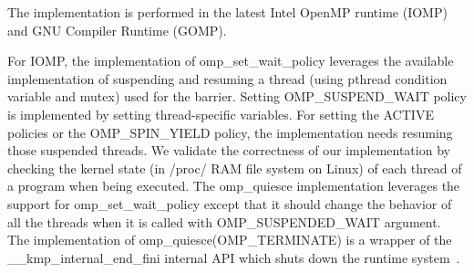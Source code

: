 The implementation is performed in the latest Intel OpenMP runtime (IOMP) and GNU Compiler Runtime (GOMP). %

For IOMP, the implementation of {\sf omp\_set\_wait\_policy} leverages the available 
implementation of suspending and resuming a thread (using pthread condition variable and mutex) 
used for the barrier. Setting  
{\sf OMP\_SUSPEND\_WAIT} policy is implemented by setting thread-specific variables. For
setting the {\sf ACTIVE} policies or the {\sf OMP\_SPIN\_YIELD} policy, 
the implementation needs resuming those suspended threads. %
We validate the correctness of our implementation by checking the kernel state (in /proc/ RAM file system on Linux) 
of each thread of a program when being executed. 
The {\sf omp\_quiesce} implementation leverages the support for {\sf omp\_set\_wait\_policy} except that it 
should change the behavior of all the threads when it is called with {\sf OMP\_SUSPENDED\_WAIT} argument. 
The implementation of {\sf omp\_quiesce(OMP\_TERMINATE)} is a wrapper of 
the {\sf \_\_kmp\_internal\_end\_fini} internal API which shuts down the runtime system~\cite{iccmanual}. 



